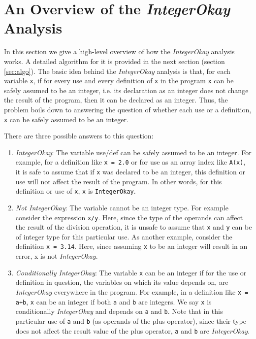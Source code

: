 \section{An Overview of the \emph{IntegerOkay} Analysis}
\label{sec:overview}

In this section we give a high-level overview of how the \emph{IntegerOkay}
analysis works. A detailed algorithm for it is provided in the next section
(section \ref{sec:algo}).
The basic idea behind the \emph{IntegerOkay} analysis is that, for each 
variable \verb|x|, if for every use and every definition of \verb|x| in the
program \verb|x| can be safely assumed to be an integer, i.e. its
declaration as an integer does not change the result of the program,
then it can be declared as an integer. Thus, the problem boils down to
answering the question of whether each use or a definition,
\verb|x| can be safely assumed to be an integer.

There are three possible answers to this question: 
\begin{enumerate}

\item \emph{IntegerOkay}: The variable use/def can be safely assumed to be an
integer.  For example, for a definition like \texttt{x = 2.0} or for use
as an array index like \texttt{A(x)}, it is safe to assume that if
\verb|x| was declared to be an integer, this definition or use will not
affect the result of the program. In other words, for this definition or
use of \verb|x|, \verb|x| is \texttt{IntegerOkay}.

\item \emph{Not IntegerOkay}: The variable cannot be an integer type.
For example consider the expression \texttt{x/y}. Here, since the type
of the operands can affect the result of the division operation, it is
unsafe to assume that \verb|x| and \verb|y| can be of integer type for
this particular use. As another example, consider the definition
\texttt{x = 3.14}. Here, since assuming \verb|x| to be an integer will
result in an error, x is not \emph{IntegerOkay}. 

\item \emph{Conditionally IntegerOkay}: The variable \verb|x| can be
an integer if for the use or definition in question, the variables on
which its value depends on, are \emph{IntegerOkay} everywhere in the
program. For example, in a definition like \texttt{x = a+b}, \verb|x|
can be an integer if both \verb|a| and \verb|b| are integers. We say
\verb|x| is conditionally \emph{IntegerOkay} and depends on \verb|a| and
\verb|b|. Note that in this particular use of \verb|a| and \verb|b| (as
operands of the plus operator), since their type does not affect the
result value of the plus operator, \verb|a| and \verb|b| are
\emph{IntegerOkay}.        

\end{enumerate}   

